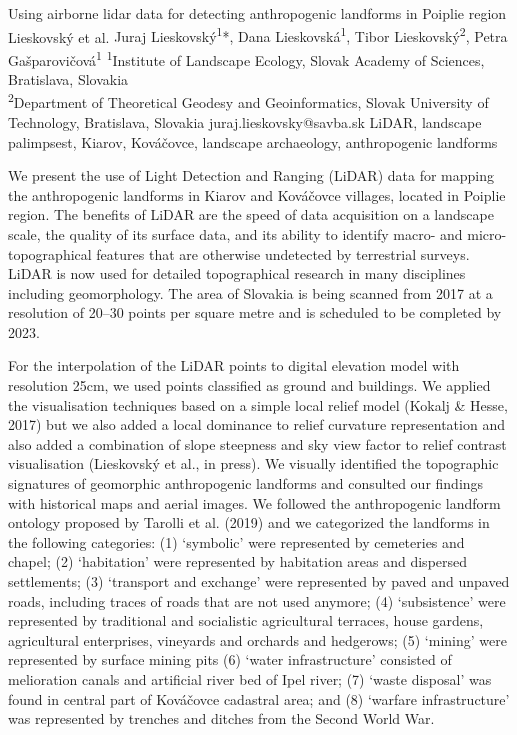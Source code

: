 
\abstract
{Using airborne lidar data for detecting anthropogenic landforms in Poiplie region} %
{Lieskovský et al.} %
{Juraj Lieskovský\textsuperscript{1}*, Dana Lieskovská\textsuperscript{1}, Tibor Lieskovský\textsuperscript{2}, Petra Gašparovičová\textsuperscript{1}} %
{\TLtag} %
{\textsuperscript{1}Institute of Landscape Ecology, Slovak Academy of Sciences, Bratislava, Slovakia\\
\textsuperscript{2}Department of Theoretical Geodesy and Geoinformatics, Slovak University of Technology, Bratislava, Slovakia
} %
{juraj.lieskovsky@savba.sk}  %
{LiDAR, landscape palimpsest, Kiarov, Kováčovce, landscape archaeology, anthropogenic landforms}%
{We present the use of Light Detection and Ranging  (LiDAR) data for mapping the anthropogenic landforms in Kiarov and Kováčovce villages, located in Poiplie region. The benefits of LiDAR are the speed of data acquisition on a landscape scale, the quality of its surface data, and its ability to identify macro- and micro-topographical features that are otherwise undetected by terrestrial surveys. LiDAR is now used for detailed topographical research in many disciplines including geomorphology. The area of Slovakia is being scanned from 2017 at a resolution of 20–30 points per square metre and is scheduled to be completed by 2023. 
	
For the interpolation of the LiDAR points to digital elevation model with resolution 25cm, we used points classified as ground and buildings. We applied the visualisation techniques based on a simple local relief model (Kokalj \& Hesse, 2017) but we also added a local dominance to relief curvature representation and also added a combination of slope steepness and sky view factor to relief contrast visualisation (Lieskovský et al., in press). We visually identified the topographic signatures of geomorphic anthropogenic landforms and consulted our findings with historical maps and aerial images. We followed the anthropogenic landform ontology proposed by Tarolli et al. (2019) and we categorized the landforms in the following categories: (1) ‘symbolic’ were represented by cemeteries and chapel; (2) ‘habitation’ were represented by habitation areas and dispersed settlements; (3) ‘transport and exchange’ were represented by paved and unpaved roads, including traces of roads that are not used anymore; (4) ‘subsistence’ were represented by traditional and socialistic agricultural terraces, house gardens, agricultural enterprises, vineyards and orchards and  hedgerows; (5) ‘mining’ were represented by surface mining pits (6) ‘water infrastructure’ consisted of melioration canals and artificial river bed of Ipel river; (7) ‘waste disposal’ was found in central part of Kováčovce cadastral area; and (8) ‘warfare infrastructure’ was represented by trenches and ditches from the Second World War.
}%
